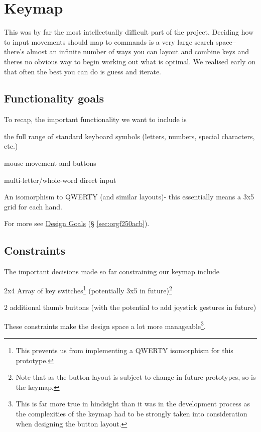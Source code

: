 \documentclass[logo,bsc,singlespacing,parskip]{infthesis}
\begin{document}
\section{Keymap}
\label{sec:org5385a41}
This was by far the most intellectually difficult part of the project.
Deciding how to input movements should map to commands is a very large search space-- there's almost an infinite number of ways you can layout and combine keys and theres no obvious way to begin working out what is optimal.
We realised early on that often the best you can do is guess and iterate.

\subsection{Functionality goals}
\label{sec:org9279934}
To recap, the important functionality we want to include is
\begin{enumerate*}[label={\arabic*)}, itemjoin={, \,}, itemjoin*={, and \,}]
\item the full range of standard keyboard symbols (letters, numbers, special characters, etc.)
\item mouse movement and buttons
\item multi-letter/whole-word direct input
\item An isomorphism to QWERTY (and similar layouts)- this essentially means a 3x5 grid for each hand.
\end{enumerate*}
For more see \hyperref[sec:orgf250acb]{Design Goals} (§ \ref{sec:orgf250acb}).

\subsection{Constraints}
\label{sec:org135edb0}
The important decisions made so far constraining our keymap include
\begin{enumerate*}[label={\arabic*)}, itemjoin={, \,}, itemjoin*={, and \,}]
\item 2x4 Array of key switches\footnote{This prevents us from implementing a QWERTY isomorphism for this prototype.} (potentially 3x5 in future)\footnote{Note that as the button layout is subject to change in future prototypes, so is the keymap.}
\item 2 additional thumb buttons (with the potential to add joystick gestures in future)
\end{enumerate*}
These constraints make the design space a lot more manageable\footnote{This is far more true in hindsight than it was in the development process as the complexities of the keymap had to be strongly taken into consideration when designing the button layout.}.
\end{document}
